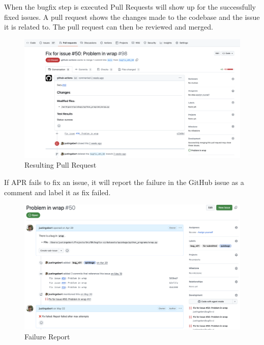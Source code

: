 When the bugfix step is executed Pull Requests will show up for the successfully fixed issues. A pull request shows the changes made to the codebase and the issue it is related to. The pull request can then be reviewed and merged.
\begin{figure}[H]
    \centering
    \includegraphics[width=1\textwidth]{images/workflow/PR.png}
    \caption{Resulting Pull Request}
    \label{fig:pr}
\end{figure}

If APR fails to fix an issue, it will report the failure in the GitHub issue as a comment and label it as fix failed.
\begin{figure}[H]
    \centering
    \includegraphics[width=1\textwidth]{images/workflow/issue comment.png}
    \caption{Failure Report}
    \label{fig:failure-report}
\end{figure}

